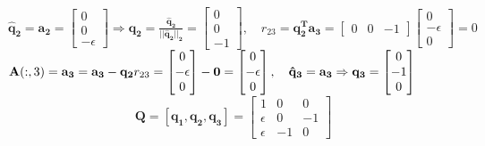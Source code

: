 \documentclass[english,onecolumn]{IEEEtran}
\begin{document}
\begin{enumerate}
    $\mathbf{\hat{q}_2 = a_2} = 
    \begin{bmatrix}
    0 \\ 0 \\ -\epsilon
    \end{bmatrix}
    \Rightarrow
    \mathbf{q_2 = \frac{\hat{q}_2}{||\hat{q}_2||_2}} = 
    \begin{bmatrix}
    0 \\ 0\\ -1
    \end{bmatrix}, \quad
    r_{23} = \mathbf{q_2^T a_3} = 
    \begin{bmatrix}
    0 & 0& -1
    \end{bmatrix}
    \begin{bmatrix}
    0 \\ -\epsilon \\ 0 
    \end{bmatrix} = 0
    $\\
    $
    \mathbf{A}(:,3) = \mathbf{a_3} = \mathbf{a_3 - q_2}  r_{23} = 
    \begin{bmatrix}
    0 \\ -\epsilon \\ 0 
    \end{bmatrix} - {\bf 0} = 
    \begin{bmatrix}
    0 \\ -\epsilon \\ 0 
    \end{bmatrix},\quad
    \mathbf{\hat{q}_3  = a_3 \Rightarrow q_3} = \begin{bmatrix}
    0 \\ -1 \\ 0 
    \end{bmatrix}
    $\\ 
    $$
    \mathbf{Q} = [\mathbf{q_1,q_2,q_3}] = 
    \begin{bmatrix}
    1 & 0 & 0 \\
    \epsilon & 0 & -1 \\
    \epsilon & -1 & 0 
    \end{bmatrix}
    $$\\
    

\end{enumerate}
\end{document}
